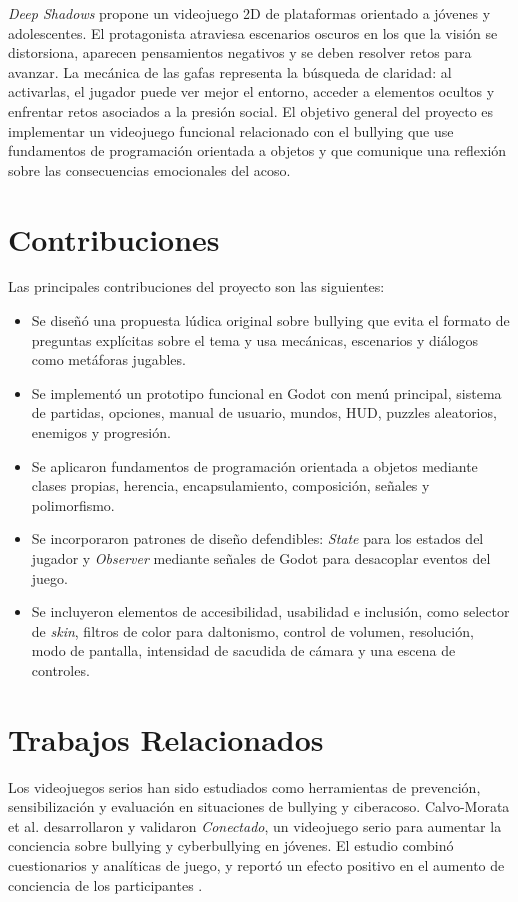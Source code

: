 \documentclass[conference]{IEEEtran}
\begin{document}
\textit{Deep Shadows} propone un videojuego 2D de plataformas orientado a jóvenes y adolescentes. El protagonista atraviesa escenarios oscuros en los que la visión se distorsiona, aparecen pensamientos negativos y se deben resolver retos para avanzar. La mecánica de las gafas representa la búsqueda de claridad: al activarlas, el jugador puede ver mejor el entorno, acceder a elementos ocultos y enfrentar retos asociados a la presión social. El objetivo general del proyecto es implementar un videojuego funcional relacionado con el bullying que use fundamentos de programación orientada a objetos y que comunique una reflexión sobre las consecuencias emocionales del acoso.

\section{Contribuciones}
Las principales contribuciones del proyecto son las siguientes:

\begin{itemize}
    \item Se diseñó una propuesta lúdica original sobre bullying que evita el formato de preguntas explícitas sobre el tema y usa mecánicas, escenarios y diálogos como metáforas jugables.
    \item Se implementó un prototipo funcional en Godot con menú principal, sistema de partidas, opciones, manual de usuario, mundos, HUD, puzzles aleatorios, enemigos y progresión.
    \item Se aplicaron fundamentos de programación orientada a objetos mediante clases propias, herencia, encapsulamiento, composición, señales y polimorfismo.
    \item Se incorporaron patrones de diseño defendibles: \textit{State} para los estados del jugador y \textit{Observer} mediante señales de Godot para desacoplar eventos del juego.
    \item Se incluyeron elementos de accesibilidad, usabilidad e inclusión, como selector de \textit{skin}, filtros de color para daltonismo, control de volumen, resolución, modo de pantalla, intensidad de sacudida de cámara y una escena de controles.
\end{itemize}

\section{Trabajos Relacionados}
Los videojuegos serios han sido estudiados como herramientas de prevención, sensibilización y evaluación en situaciones de bullying y ciberacoso. Calvo-Morata et al. desarrollaron y validaron \textit{Conectado}, un videojuego serio para aumentar la conciencia sobre bullying y cyberbullying en jóvenes. El estudio combinó cuestionarios y analíticas de juego, y reportó un efecto positivo en el aumento de conciencia de los participantes \cite{calvo2021}.
\end{document}
